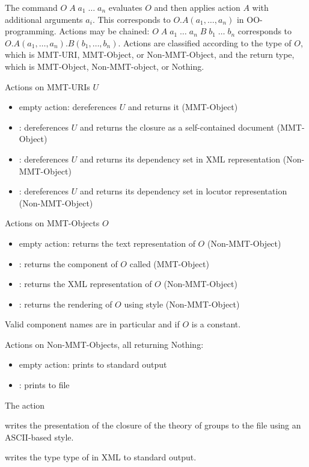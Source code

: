 The command $O\;A\;a_1\;\ldots\;a_n$ evaluates $O$ and then applies action $A$ with additional arguments $a_i$. This corresponds to $O.A(a_1,\ldots,a_n)$ in OO-programming. Actions may be chained: $O\;A\;a_1\;\ldots\;a_n \;B\;b_1\;\ldots\;b_n$ corresponds to $O.A(a_1,\ldots,a_n).B(b_1,\ldots,b_n)$. Actions are classified according to the type of $O$, which is MMT-URI, MMT-Object, or Non-MMT-Object, and the return type, which is MMT-Object, Non-MMT-object, or Nothing.
\smallskip

\noindent
Actions on MMT-URIs $U$
\begin{itemize}
\item empty action: dereferences $U$ and returns it (MMT-Object)
\item {}: dereferences $U$ and returns the closure as a self-contained document (MMT-Object)
\item {}: dereferences $U$ and returns its dependency set in XML representation (Non-MMT-Object)
\item {}: dereferences $U$ and returns its dependency set in locutor representation (Non-MMT-Object)
\end{itemize}

\noindent
Actions on MMT-Objects $O$
\begin{itemize}
\item empty action: returns the text representation of $O$ (Non-MMT-Object)
\item {}: returns the component of $O$ called  (MMT-Object)
\item {}: returns the XML representation of $O$ (Non-MMT-Object)
\item {}: returns the rendering of $O$ using style  (Non-MMT-Object)
\end{itemize}
Valid component names  are in particular  and  if $O$ is a constant.


\noindent
Actions on Non-MMT-Objects, all returning Nothing:
\begin{itemize}
\item empty action: prints to standard output
\item {}: prints to file 
\end{itemize}

\begin{example}
The action

\noindent
{}
writes the presentation of the closure of the theory of groups to the file  using an ASCII-based style.

\noindent
{}
writes the type type of  in XML to standard output.
\end{example}

